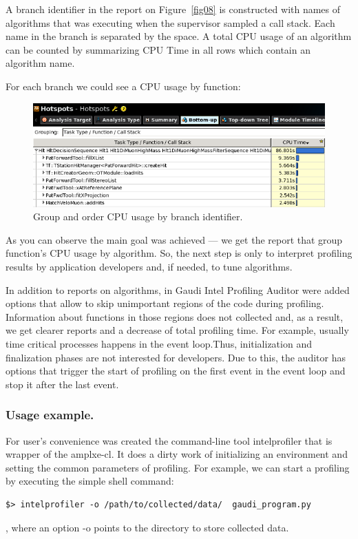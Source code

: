 \documentclass[a4paper]{jpconf}
\begin{document}
A branch identifier in the report on Figure~\ref{fig08} is constructed with names of algorithms that was executing when the \amp supervisor sampled a call stack. Each name in the branch is separated by the space. A total CPU usage of an algorithm can be counted by summarizing CPU Time in all rows which contain an algorithm name.

For each branch we could see a CPU usage by function:

\begin{figure}[H]
\begin{minipage}{\textwidth}
\includegraphics[width=\textwidth]{figs/fig09.png}
\caption{\label{fig09}Group and order CPU usage by branch identifier.}
\end{minipage}
\end{figure}

As you can observe the main goal was achieved --- we get the report that group function’s CPU usage by algorithm. So, the next step is only to interpret profiling results by application developers and, if needed, to tune algorithms.

In addition to reports on algorithms, in Gaudi Intel Profiling Auditor were added options that allow to skip unimportant regions of the code during profiling. Information about functions in those regions does not collected and, as a result, we get clearer reports and a decrease of total profiling time. For example, usually time critical processes happens in the event loop.Thus, initialization and finalization phases are not interested for developers. Due to this, the auditor has options that trigger the start of  profiling on the first event in the event loop and stop it after the last event. 

\subsubsection{Usage example.}

For user’s convenience was created the command-line tool intelprofiler that is wrapper of the amplxe-cl. It does a dirty work of initializing an environment and setting the common parameters of profiling. For example, we can start a profiling by executing the simple shell command:
\begin{verbatim}
$> intelprofiler -o /path/to/collected/data/  gaudi_program.py
\end{verbatim}
, where an option -o points to the directory to store collected data. 
\end{document}
